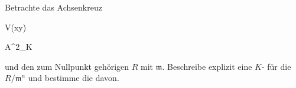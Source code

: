
{}

{


Betrachte das Achsenkreuz


\mavergleichskette

{\vergleichskette

{ V(xy)
}

{ \subseteq }{ {\mathbb A}^{2}_{K}
}

{  }{
}

{    }{
}

{   }{
}

}
{}{}{}
und den zum Nullpunkt gehörigen
$R$ mit
${\mathfrak m}$. Beschreibe explizit eine
$K$-
für die
$R/{\mathfrak m}^n$ und bestimme die
davon.


}

{} {}



{}

